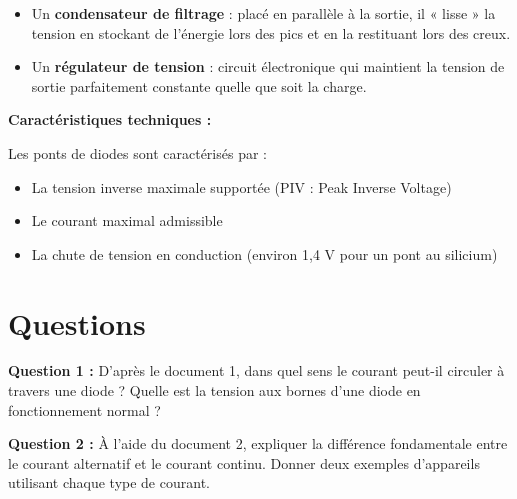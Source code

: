 \documentclass[11pt,a4paper]{article}
\begin{document}
\begin{itemize}
\item Un \textbf{condensateur de filtrage} : placé en parallèle à la sortie, il « lisse » la tension en stockant de l'énergie lors des pics et en la restituant lors des creux.
\item Un \textbf{régulateur de tension} : circuit électronique qui maintient la tension de sortie parfaitement constante quelle que soit la charge.
\end{itemize}

\vspace{0.3cm}
\textbf{Caractéristiques techniques :}

Les ponts de diodes sont caractérisés par :
\begin{itemize}
\item La tension inverse maximale supportée (PIV : Peak Inverse Voltage)
\item Le courant maximal admissible
\item La chute de tension en conduction (environ 1,4 V pour un pont au silicium)
\end{itemize}

\newpage

\section{Questions}

\textbf{Question 1 :} D'après le document 1, dans quel sens le courant peut-il circuler à travers une diode ? Quelle est la tension aux bornes d'une diode en fonctionnement normal ?

\vspace{0.3cm}
\noindent
\fbox{\parbox{\dimexpr\textwidth-2\fboxsep-2\fboxrule\relax}{
\vspace{2cm}
\hspace{1cm}
\vspace{0.1cm}
}}
\vspace{0.5cm}

\textbf{Question 2 :} À l'aide du document 2, expliquer la différence fondamentale entre le courant alternatif et le courant continu. Donner deux exemples d'appareils utilisant chaque type de courant.

\vspace{0.3cm}
\noindent
\fbox{\parbox{\dimexpr\textwidth-2\fboxsep-2\fboxrule\relax}{
\vspace{3cm}
\hspace{1cm}
\vspace{0.1cm}
}}
\vspace{0.5cm}
\end{document}
